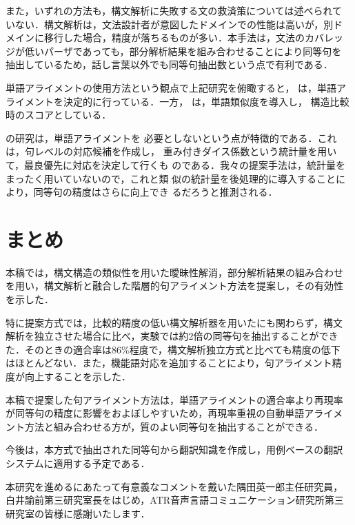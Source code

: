 また，いずれの方法も，構文解析に失敗する文の救済策については述べられて
いない．構文解析は，文法設計者が意図したドメインでの性能は高いが，別ド
メインに移行した場合，精度が落ちるものが多い．本手法は，文法のカバレッ
ジが低いパーザであっても，部分解析結果を組み合わせることにより同等句を
抽出しているため，話し言葉以外でも同等句抽出数という点で有利である．

単語アライメントの使用方法という観点で上記研究を俯瞰すると，
は，単語アライメントを決定的に行っている．一方，
は，単語類似度を導入し，
構造比較時のスコアとしている．

の研究は，単語アライメントを
必要としないという点が特徴的である．これは，句レベルの対応候補を作成し，
重み付きダイス係数という統計量を用いて，最良優先に対応を決定して行くも
のである．我々の提案手法は，統計量をまったく用いていないので，これと類
似の統計量を後処理的に導入することにより，同等句の精度はさらに向上でき
るだろうと推測される．



\section{まとめ}

本稿では，構文構造の類似性を用いた曖昧性解消，部分解析結果の組み合わせ
を用い，構文解析と融合した階層的句アライメント方法を提案し，その有効性
を示した．

特に提案方式では，比較的精度の低い構文解析器を用いたにも関わらず，構文
解析を独立させた場合に比べ，実験では約2倍の同等句を抽出することができ
た．そのときの適合率は86\%程度で，構文解析独立方式と比べても精度の低下
はほとんどない．また，機能語対応を追加することにより，句アライメント精
度が向上することを示した．

本稿で提案した句アライメント方法は，単語アライメントの適合率より再現率
が同等句の精度に影響をおよぼしやすいため，再現率重視の自動単語アライメ
ント方法と組み合わせる方が，質のよい同等句を抽出することができる．

今後は，本方式で抽出された同等句から翻訳知識を作成し，用例ベースの翻訳
システムに適用する予定である．


\acknowledgment

本研究を進めるにあたって有意義なコメントを戴いた隅田英一郎主任研究員，
白井諭前第三研究室長をはじめ，ATR音声言語コミュニケーション研究所第三
研究室の皆様に感謝いたします．

